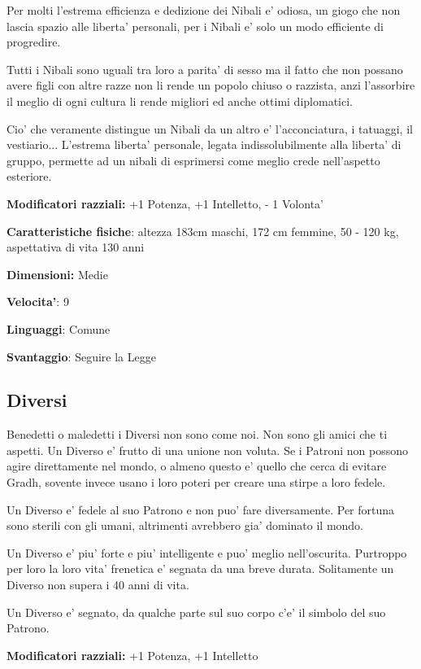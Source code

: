 \documentclass[a4paper,11pt,twoside,openany]{dndbook}
\begin{document}
Per molti l'estrema efficienza e dedizione dei Nibali e' odiosa, un giogo che non lascia spazio alle liberta' personali, per i Nibali e' solo un modo efficiente di progredire.

Tutti i Nibali sono uguali tra loro a parita' di sesso ma il fatto che non possano avere figli con altre razze non li rende un popolo chiuso o razzista, anzi l'assorbire il meglio di ogni cultura li rende migliori ed anche ottimi diplomatici. 

Cio' che veramente distingue un Nibali da un altro e' l'acconciatura, i tatuaggi, il vestiario... L'estrema liberta' personale, legata indissolubilmente alla liberta' di gruppo, permette ad un nibali di esprimersi come meglio crede nell'aspetto esteriore.

\textbf{Modificatori razziali:} +1 Potenza, +1 Intelletto, - 1 Volonta'

\textbf{Caratteristiche fisiche}: altezza 183cm maschi, 172 cm femmine, 50 - 120 kg, aspettativa di vita 130 anni

\textbf{Dimensioni:} Medie

\textbf{Velocita'}: 9

\textbf{Linguaggi}: Comune

\textbf{Svantaggio}: Seguire la Legge

\subsection{Diversi}

\label{diversi}

Benedetti o maledetti i Diversi non sono come noi. Non sono gli amici che ti aspetti. Un Diverso e' frutto di una unione non voluta. Se i Patroni non possono agire direttamente nel mondo, o almeno questo e' quello che cerca di evitare Gradh, sovente invece usano i loro poteri per creare una stirpe a loro fedele.

Un Diverso e' fedele al suo Patrono e non puo' fare diversamente. Per fortuna sono sterili con gli umani, altrimenti avrebbero gia' dominato il mondo.

Un Diverso e' piu' forte e piu' intelligente e puo' meglio nell'oscurita. Purtroppo per loro la loro vita' frenetica e' segnata da una breve durata. Solitamente un Diverso non supera i 40 anni di vita.

Un Diverso e' segnato, da qualche parte sul suo corpo c'e' il simbolo del suo Patrono.

\textbf{Modificatori razziali:} +1 Potenza, +1 Intelletto
\end{document}
